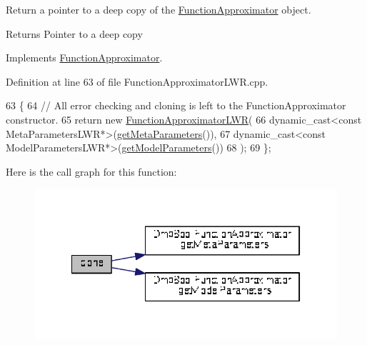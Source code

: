 Return a pointer to a deep copy of the \hyperlink{classDmpBbo_1_1FunctionApproximator}{Function\+Approximator} object. 

\begin{DoxyReturn}{Returns}
Pointer to a deep copy 
\end{DoxyReturn}


Implements \hyperlink{classDmpBbo_1_1FunctionApproximator_a9b6a690060f1d845da16d6d739ded2d9}{Function\+Approximator}.



Definition at line 63 of file Function\+Approximator\+L\+W\+R.\+cpp.


\begin{DoxyCode}
63                                                                \{
64   \textcolor{comment}{// All error checking and cloning is left to the FunctionApproximator constructor.}
65   \textcolor{keywordflow}{return} \textcolor{keyword}{new} \hyperlink{classDmpBbo_1_1FunctionApproximatorLWR_a614a73ce1a2298ddd81fe529dfd6ed91}{FunctionApproximatorLWR}(
66     dynamic\_cast<const MetaParametersLWR*>(\hyperlink{classDmpBbo_1_1FunctionApproximator_a6f1a44062eac61d88b647c358bcda155}{getMetaParameters}()),
67     dynamic\_cast<const ModelParametersLWR*>(\hyperlink{classDmpBbo_1_1FunctionApproximator_a0e7e116ed9b159d782fca544dacb4bac}{getModelParameters}())
68     );
69 \};
\end{DoxyCode}


Here is the call graph for this function\+:
\nopagebreak
\begin{figure}[H]
\begin{center}
\leavevmode
\includegraphics[width=322pt]{classDmpBbo_1_1FunctionApproximatorLWR_ad792a46ac006916c5c1ffed2fa42dd24_cgraph}
\end{center}
\end{figure}


